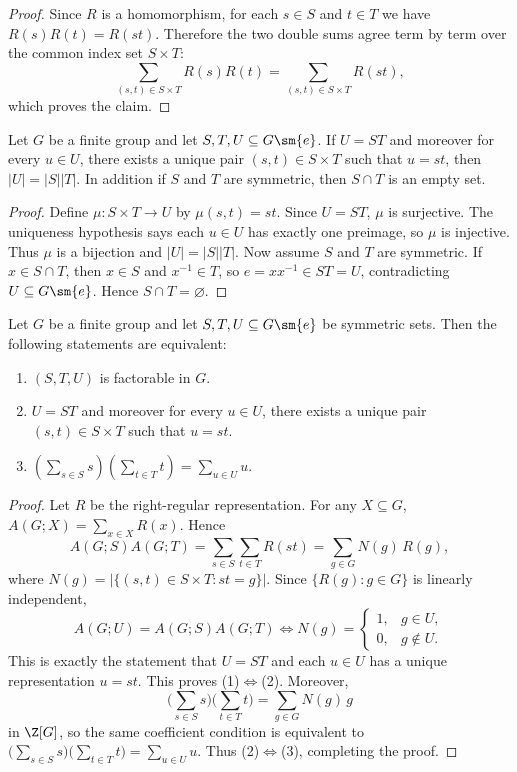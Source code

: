 \documentclass{file}
\begin{document}
\begin{proof}
Since $R$ is a homomorphism, for each $s\in S$ and $t\in T$ we have $R(s)R(t)=R(st)$.
Therefore the two double sums agree term by term over the common index set $S\times T$:
\[
\sum_{(s,t)\in S\times T} R(s)R(t)=\sum_{(s,t)\in S\times T} R(st),
\]
which proves the claim.
\end{proof}


\begin{lem}\label{lem:product_2}
Let $G$ be a finite group and let $S,T,U \subseteq G\sm \{e\}$. 
If $U=ST$ and moreover for every $u\in U $, there exists a unique pair $(s,t)\in S\times T$ such that $u=st$, then $|U|=|S||T|$.
In addition if $S$ and $T$ are symmetric, then $S\cap T$ is an empty set.
\end{lem}

\begin{proof}
Define $\mu:S\times T\to U$ by $\mu(s,t)=st$. Since $U=ST$, $\mu$ is surjective.
The uniqueness hypothesis says each $u\in U$ has exactly one preimage, so $\mu$ is injective.
Thus $\mu$ is a bijection and $|U|=|S||T|$.
Now assume $S$ and $T$ are symmetric. If $x\in S\cap T$, then $x\in S$ and $x^{-1}\in T$,
so $e=xx^{-1}\in ST=U$, contradicting $U\subseteq G\sm\{e\}$. Hence $S\cap T=\varnothing$.
\end{proof}



\begin{thm}\label{thm:main_1}
Let $G$ be a finite group and let $S,T,U \subseteq G\sm \{e\}$ be symmetric sets. 
Then the following statements are equivalent:
\begin{enumerate}
    \item $(S,T,U)$ is factorable in $G$.
    \item $U=ST$ and moreover for every $u\in U $, there exists a unique pair $(s,t)\in S\times T$ such that $u=st$.
    \item $(\sum_{s\in S} s)(\sum_{t\in T}t )=\sum_{u\in U}u$.
\end{enumerate}
\end{thm}

\begin{proof}
Let $R$ be the right-regular representation. For any $X\subseteq G$,
$A(G;X)=\sum_{x\in X}R(x)$. Hence
\[
A(G;S)A(G;T)=\sum_{s\in S}\sum_{t\in T}R(st)=\sum_{g\in G}N(g)\,R(g),
\]
where $N(g)=|\{(s,t)\in S\times T:st=g\}|$.
Since $\{R(g):g\in G\}$ is linearly independent,
\[
A(G;U)=A(G;S)A(G;T)\iff
N(g)=\begin{cases}1,&g\in U,\\0,&g\notin U.\end{cases}
\]
This is exactly the statement that $U=ST$ and each $u\in U$ has a unique representation $u=st$.
This proves (1)$\Leftrightarrow$(2).
Moreover,
\[
\Big(\sum_{s\in S}s\Big)\Big(\sum_{t\in T}t\Big)=\sum_{g\in G}N(g)\,g
\]
in $\Z[G]$, so the same coefficient condition is equivalent to
$\bigl(\sum_{s\in S}s\bigr)\bigl(\sum_{t\in T}t\bigr)=\sum_{u\in U}u$.
Thus (2)$\Leftrightarrow$(3), completing the proof.
\end{proof}
\end{document}
